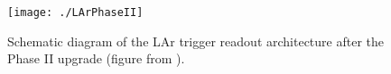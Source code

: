 

\begin{figure}[h!]
  \centering
	\texttt{[image: ./LArPhaseII]}
\caption[Schematic diagram of the LAr trigger readout architecture after the Phase II upgrade]{\label{fig:larPhaseII}{Schematic diagram of the LAr trigger readout architecture after the Phase II upgrade (figure from \cite{LArPhaseIItdr}).}}
\end{figure}


